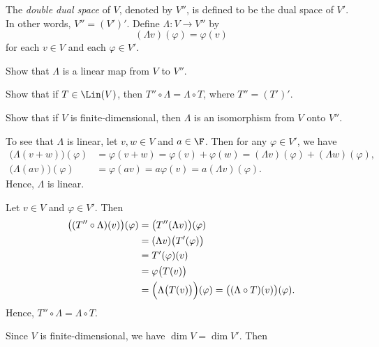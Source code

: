 \begin{exc}
\begin{exercise}
The \emph{double dual space} of $V$, denoted by $V''$, is defined to be the
dual space of $V'$. In other words, $V''=(V')'$. Define $\Lambda\colon V\to V''$
by
\[ (\Lambda v)(\varphi) = \varphi(v) \]
for each $v\in V$ and each $\varphi\in V'$.
\begin{parts}
\item Show that $\Lambda$ is a linear map from $V$ to $V''$.
\item Show that if $T\in\Lin(V)$, then $T''\circ\Lambda=\Lambda\circ T$, where
  $T''=(T')'$.
\item Show that if $V$ is finite-dimensional, then $\Lambda$ is an isomorphism
  from $V$ onto $V''$.
\end{parts}
\end{exercise}
\begin{solution}\leavevmode
\begin{parts}
\item To see that $\Lambda$ is linear, let $v,w\in V$ and $a\in\F$. Then for
  any $\varphi\in V'$, we have
  \begin{align*}
  \bigl(\Lambda(v+w)\bigr)(\varphi) &= \varphi(v+w) = \varphi(v)+\varphi(w)
    = (\Lambda v)(\varphi)+(\Lambda w)(\varphi),\\
  \bigl(\Lambda(av)\bigr)(\varphi) &= \varphi(av) = a\varphi(v)
    = a(\Lambda v)(\varphi).
  \end{align*}
  Hence, $\Lambda$ is linear.
\item Let $v\in V$ and $\varphi\in V'$. Then
  \begin{align*}
  \bigl((T''\circ\Lambda)(v)\bigr)(\varphi)
   &= \bigl(T''(\Lambda v)\bigr)(\varphi)\\
   &= (\Lambda v)\bigl(T'(\varphi)\bigr)\\
   &= T'(\varphi)(v)\\
   &= \varphi\bigl(T(v)\bigr)\\
   &= \Bigl(\Lambda\bigl(T(v)\bigr)\Bigr)(\varphi)
    = \bigl((\Lambda\circ T)(v)\bigr)(\varphi).
  \end{align*}
  Hence, $T''\circ\Lambda=\Lambda\circ T$.
\item Since $V$ is finite-dimensional, we have $\dim V=\dim V'$. Then

\end{parts}
\end{solution}
\end{exc}
